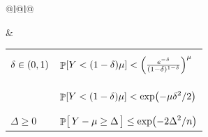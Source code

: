 \begin{center}
{\begin{tabular}[t]{@{}l@{\qquad}l@{}}
{\begin{tabular}[t]{l l l}
{          \mu \delta \ln \delta }$
        &
          \lemref{chernoff:delta:r:big}%
          \\
            \midrule
            $\BadProb \in (0,1]$
        &
          \multicolumn{2}{l}{%
          $\biggl.\Prob{ \bigl. Y > (1+\delta)\mu
          + \smash{\displaystyle \frac{3\ln
          \BadProb^{-1}}{\delta^2}} \biggr.}
          < \BadProb$.
          }
          \\
            \rowcolor{white}
        & &
            \lemref{chandra:wanted:it}%
        \\
            \bottomrule
          \end{tabular}}%
          &
            \begin{tabular}[t]{l l l}
            \toprule 
            \rowcolor{red!10}
            \multicolumn{3}{c}{%
            $X_i \in \brc{0,1}$
            \quad%
            $\Bigl.\!\Prob{ X_i = 1 } =p_i$,
            $\Prob{ X_i = 0 } =1-p_i$
            }
            \\
            \midrule 
            $\delta \in (0,1)\Bigl.$%
            &
              \multicolumn{2}{l}{
              $\Prob{ Y < (1-\delta)\mu } < \Bigl(
              \frac{e^{-\delta}}{(1-\delta)^{1-\delta}}
              \Bigr)^\mu \Biggr.$}
              \\&
            &
              \thmref{Chernoff:2}
            \\
            \rowcolor{gray!25}
            &
              \multicolumn{2}{l}{$ \displaystyle \Prob{ Y < (1-\delta)\mu } < \exp
              \pth{-\mu\delta^2/2}\Bigr. $}
              \\
            \rowcolor{gray!25}
            &&
              \lemref{chernoff:2:s}
            \\
            \midrule 
            $\Delta \geq 0$
            &
              \multicolumn{2}{l}{
                  \begin{math}%
                      \ds%
                      \Prob{\bigl.\,Y - \mu \geq \Delta\, }%
                      \leq%
                      \exp\pth{ -2 \Delta^2/n}
                  \end{math}}
            \\%

\end{tabular}
\end{tabular}}
\end{center}
